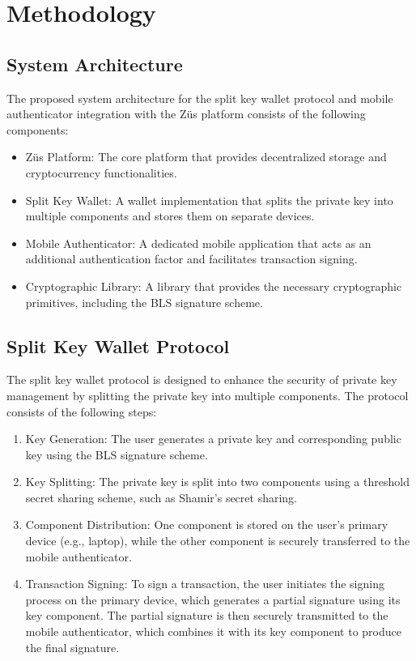 \chapter{Methodology}
\label{Chapter3} %
\section{System Architecture}
The proposed system architecture for the split key wallet protocol and mobile authenticator integration with the Züs platform consists of the following components:
\begin{itemize}
\item Züs Platform: The core platform that provides decentralized storage and cryptocurrency functionalities.
\item Split Key Wallet: A wallet implementation that splits the private key into multiple components and stores them on separate devices.
\item Mobile Authenticator: A dedicated mobile application that acts as an additional authentication factor and facilitates transaction signing.
\item Cryptographic Library: A library that provides the necessary cryptographic primitives, including the BLS signature scheme.
\end{itemize}
\section{Split Key Wallet Protocol}
The split key wallet protocol is designed to enhance the security of private key management by splitting the private key into multiple components. The protocol consists of the following steps:
\begin{enumerate}
\item Key Generation: The user generates a private key and corresponding public key using the BLS signature scheme.
\item Key Splitting: The private key is split into two components using a threshold secret sharing scheme, such as Shamir's secret sharing.
\item Component Distribution: One component is stored on the user's primary device (e.g., laptop), while the other component is securely transferred to the mobile authenticator.
\item Transaction Signing: To sign a transaction, the user initiates the signing process on the primary device, which generates a partial signature using its key component. The partial signature is then securely transmitted to the mobile authenticator, which combines it with its key component to produce the final signature.
\end{enumerate}
